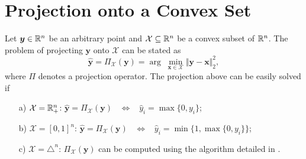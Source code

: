 \section{Projection onto a Convex Set} \label{sec:projection_onto_cvx_set}
Let $\bm y \in \mathbb R^n$ be an arbitrary point and $\mathcal X \subseteq \mathbb R^n$ be
a convex subset of $\mathbb R^n$.
The problem of projecting $\bm y$ onto $\mathcal X$ can be stated as
\begin{equation}
    \hat{\bm y} =
    \Pi_{\mathcal X}(\bm y) =
    \arg \; \underset{\bm x \in \mathcal X}{\min}
            \Vert \bm y - \bm x \Vert_2^2,
\end{equation}
where $\Pi$ denotes a projection operator.
The projection above can be easily solved if
\begin{itemize}
    \item [a)]$\mathcal X = \mathbb R_+^n$: \newline
              $\hat{\bm y} = \Pi_{\mathcal X}(\bm y) \;\;\;
              \Leftrightarrow \;\;\; \hat{y}_i = \max\{0,y_i\}$;%
    \item [b)]$\mathcal X = [0,1]^n$: \newline
              $\hat{\bm y} = \Pi_{\mathcal X}(\bm y) \;\;\;
              \Leftrightarrow \;\;\; \hat{y}_i = \min\{1,\max\{0,y_i\}\}$;%
    \item [c)]$\mathcal X = \triangle^n$: \newline
              $\Pi_{\mathcal X}(\bm y)$ can
              be computed using the algorithm detailed in \cite{SIMPLEX_PROJ}.%
\end{itemize}

